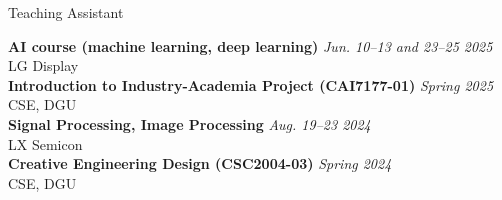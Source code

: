 \begin{rSection}{Teaching Assistant}

{\bf AI course (machine learning, deep learning)} \hfill {\em Jun. 10--13 and 23--25 2025} \\
LG Display\\

{\bf Introduction to Industry-Academia Project (CAI7177-01)} \hfill {\em Spring 2025} \\
\acf{CSE}, \acf{DGU}\\

{\bf Signal Processing, Image Processing} \hfill {\em Aug. 19--23 2024} \\
LX Semicon\\

{\bf Creative Engineering Design (CSC2004-03)} \hfill {\em Spring 2024} \\
\acf{CSE}, \acf{DGU}\\

\end{rSection}
    
